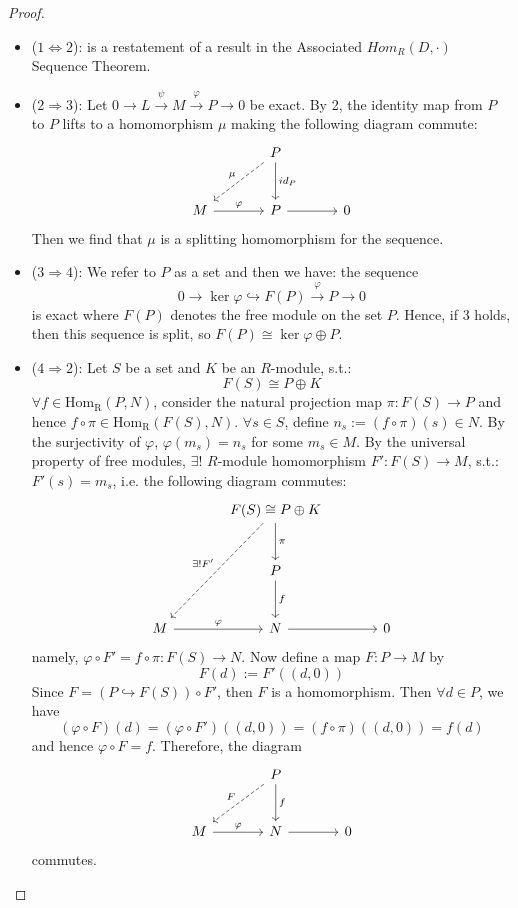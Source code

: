 \begin{proof}
    \begin{itemize}
        \item ($1 \Leftrightarrow 2$): is a restatement of a result in the Associated $Hom_R (D,\cdot)$ Sequence Theorem.

        \item ($2 \Rightarrow3$): Let $0 \to L \overset{\psi}{\to} M \overset{\varphi}{\to} P \to 0$ be exact. By 2, the identity map from $P$ to $P$ lifts to a homomorphism $\mu$ making the following diagram commute:
        \[
        \begin{tikzcd}[row sep=large, column sep=large]
            & P \arrow[dl, dashed, "\mu"'] \arrow[d, "id_P"] & \\
            M \arrow[r, "\varphi"] & P \arrow[r] &0
        \end{tikzcd}
        \]
        Then we find that $\mu$ is a splitting homomorphism for the sequence.

        \item ($3 \Rightarrow 4$): We refer to $P$ as a set and then we have: the sequence
        \[
        0 \to \ker \varphi \hookrightarrow F(P) \overset{\varphi}{\to} P \to 0
        \]
        is exact where $F(P)$ denotes the free module on the set $P$. Hence, if 3 holds, then this sequence is split, so $F(P) \cong \ker \varphi \oplus P$.

        \item ($4 \Rightarrow 2$): Let $S$ be a set and $K$ be an $R$-module, s.t.:
        $$F(S) \cong P\oplus K$$
        $\forall f\in \text{Hom}_\text{R} (P,N)$, consider the natural projection map $\pi: F(S) \to P$ and hence $f \circ \pi \in \text{Hom}_\text{R} (F(S),N)$. $\forall s\in S$, define $n_s:=(f \circ \pi) (s) \in N$. By the surjectivity of $\varphi$, $\varphi (m_s) =n_s$ for some $m_s \in M$. By the universal property of free modules, $\exists!$ $R$-module homomorphism $F': F(S) \to M$, s.t.: $F'(s) =m_s$, i.e. the following diagram commutes:
        \[
        \begin{tikzcd}[row sep=large, column sep=large]
            & F(S) \arrow[ddl, dashed, "\exists {!F'}"'] \arrow[d, "\pi"] \cong P \oplus K & \\
            & P \arrow[d, "f"] & \\
            M \arrow[r, "\varphi"] & N \arrow[r] &0
        \end{tikzcd}
        \]
        namely, $\varphi \circ F' =f\circ \pi :F(S) \to N$. Now define a map $F:P \to M$ by
        $$F(d) := F'((d,0))$$
        Since $F= (P \hookrightarrow F(S)) \circ F'$, then $F$ is a homomorphism. Then $\forall d\in P$, we have
        $$(\varphi \circ F) (d) = (\varphi \circ F') ((d,0)) = (f\circ \pi) ((d,0)) =f(d)$$
        and hence $\varphi \circ F=f$. Therefore, the diagram
        \[
        \begin{tikzcd}[row sep=large, column sep=large]
            & P \arrow[dl, dashed, "F"'] \arrow[d, "f"] & \\
            M \arrow[r, "\varphi"] & N \arrow[r] &0
        \end{tikzcd}
        \]
        commutes.
    \end{itemize}
\end{proof}

